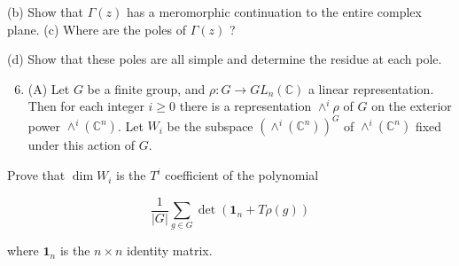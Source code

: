 \documentclass[10pt]{article}
\begin{document}
(b) Show that $\Gamma(z)$ has a meromorphic continuation to the entire complex plane.
(c) Where are the poles of $\Gamma(z)$ ?

(d) Show that these poles are all simple and determine the residue at each pole.

\begin{enumerate}
  \setcounter{enumi}{5}
  \item (A) Let $G$ be a finite group, and $\rho: G \rightarrow G L_{n}(\mathbb{C})$ a linear representation. Then for each integer $i \geq 0$ there is a representation $\wedge^{i} \rho$ of $G$ on the exterior power $\wedge^{i}\left(\mathbb{C}^{n}\right)$. Let $W_{i}$ be the subspace $\left(\wedge^{i}\left(\mathbb{C}^{n}\right)\right)^{G}$ of $\wedge^{i}\left(\mathbb{C}^{n}\right)$ fixed under this action of $G$.
\end{enumerate}

Prove that $\operatorname{dim} W_{i}$ is the $T^{i}$ coefficient of the polynomial

$$
\frac{1}{|G|} \sum_{g \in G} \operatorname{det}\left(\mathbf{1}_{n}+T \rho(g)\right)
$$

where $\mathbf{1}_{n}$ is the $n \times n$ identity matrix.
\end{document}
